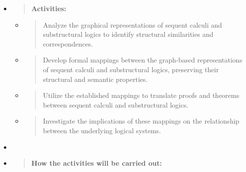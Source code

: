 \begin{itemize}
\item
  \begin{quote}
  \textbf{Activities:\\
  }
  \end{quote}

  \begin{itemize}
  \item
    \begin{quote}
    Analyze the graphical representations of sequent calculi and
    substructural logics to identify structural similarities and
    correspondences.
    \end{quote}
  \item
    \begin{quote}
    Develop formal mappings between the graph-based representations of
    sequent calculi and substructural logics, preserving their
    structural and semantic properties.
    \end{quote}
  \item
    \begin{quote}
    Utilize the established mappings to translate proofs and theorems
    between sequent calculi and substructural logics.
    \end{quote}
  \item
    \begin{quote}
    Investigate the implications of these mappings on the relationship
    between the underlying logical systems.
    \end{quote}
  \end{itemize}
\item
\item
  \begin{quote}
  \textbf{How the activities will be carried out:\\
  }
  \end{quote}


\end{itemize}
